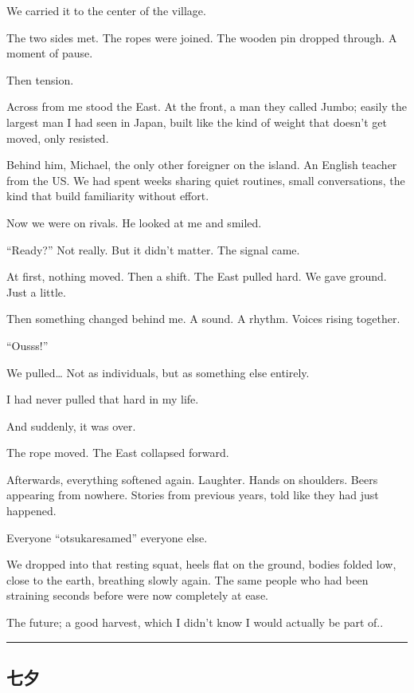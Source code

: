 \documentclass[
  letterpaper,
  oneside]{scrbook}
\begin{document}
We carried it to the center of the village.

The two sides met. The ropes were joined. The wooden pin dropped
through. A moment of pause.

Then tension.

Across from me stood the East. At the front, a man they called Jumbo;
easily the largest man I had seen in Japan, built like the kind of
weight that doesn't get moved, only resisted.

Behind him, Michael, the only other foreigner on the island. An English
teacher from the US. We had spent weeks sharing quiet routines, small
conversations, the kind that build familiarity without effort.

Now we were on rivals. He looked at me and smiled.

``Ready?'' Not really. But it didn't matter. The signal came.

At first, nothing moved. Then a shift. The East pulled hard. We gave
ground. Just a little.

Then something changed behind me. A sound. A rhythm. Voices rising
together.

``Ousss!''

We pulled\ldots{} Not as individuals, but as something else entirely.

I had never pulled that hard in my life.

And suddenly, it was over.

The rope moved. The East collapsed forward.

Afterwards, everything softened again. Laughter. Hands on shoulders.
Beers appearing from nowhere. Stories from previous years, told like
they had just happened.

Everyone ``otsukaresamed'' everyone else.

We dropped into that resting squat, heels flat on the ground, bodies
folded low, close to the earth, breathing slowly again. The same people
who had been straining seconds before were now completely at ease.

The future; a good harvest, which I didn't know I would actually be part
of..

\begin{center}\rule{0.5\linewidth}{0.5pt}\end{center}

\subsection{七夕}\label{ux4e03ux5915}
\end{document}
